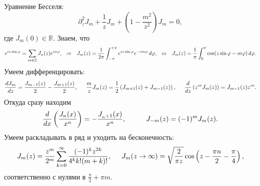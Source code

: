 
Уравнение Бесселя:
\begin{equation*}
    \partial_z^2 J_m + \frac{1}{z} J_m + \left(1 - \frac{m^2}{z^2}\right) J_m = 0,
\end{equation*}
где $J_m(0) \in \mathbb{R}$. Знаем, что
\begin{equation*}
    e^{i z \sin \varphi} = \sum_{m \in \mathbb{Z}} 
    J_n (z) e^{i n \varphi},
    \hspace{0.25cm} \Rightarrow \hspace{0.25cm}
    J_m (z) = \frac{1}{2\pi} \int_{-\pi}^{+\pi}e^{i z \sin \varphi} e^{- i m \varphi} \, d \varphi,
    \hspace{2.5 mm} 
    \Leftrightarrow
    \hspace{2.5 mm} 
    J_m (z) = \frac{1}{\pi} \int_{0}^{\pi} \cos(z \sin \varphi - m \varphi) \, d \varphi.
\end{equation*}
Умеем дифференцировать:
\begin{equation}
    \frac{d J_m}{d z} = \frac{J_{m-1} (z)}{2} - \frac{J_{m+1}(z)}{2},
    \hspace{5 mm}
    \frac{m}{z} J_m (z) = \frac{1}{2} \left(J_{m+1} (z) + J_{m-1}(z)\right),
    \hspace{5 mm} 
    \frac{d }{d z} \left(z^m J_m (z)\right) = J_{m-1} (z) z^m.
\end{equation}
Откуда сразу находим
\begin{equation}
    \frac{d }{d x} \left(\frac{J_n (x)}{x^n }\right) = - \frac{J_{_n+1}(x)}{x^n},
    \hspace{10 mm} 
    J_{-m} (z) = (-1)^m J_m (z).
\end{equation}
Умеем раскладывать в ряд и уходить на бесконечность:
\begin{equation*}
    J_m (z) = \frac{z^m}{2^m} \sum_{k=0}^{\infty} \frac{(-1)^k z^{2k}}{4^k k! (m+k)!},
    \hspace{5 mm} 
    J_m (z \to \infty) = \sqrt{\frac{2}{\pi z}} \cos\left(
        z - \frac{\pi n }{2} - \frac{\pi}{4}
    \right),
\end{equation*}
соответственно с нулями в $\frac{\pi}{2} + \pi m$. 

